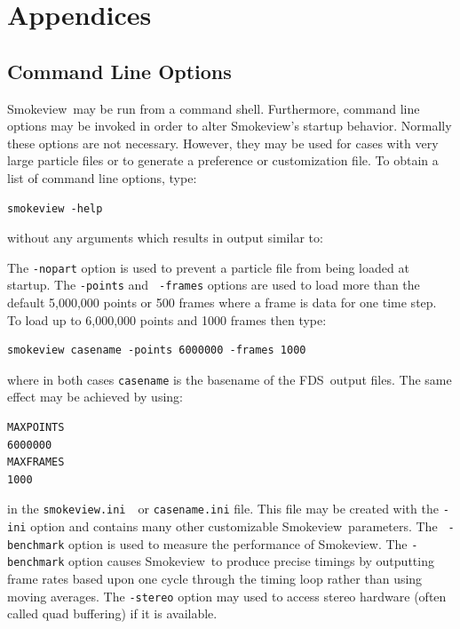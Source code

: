 \documentclass[11pt,twoside]{book}
\newcommand{\svini}{{\tt smokeview.ini}\ }
\newcommand{\fds}{{FDS}}
\newcommand{\Smokeview}{{Smokeview}}
\newcommand{\smokeview}{{Smokeview}}
\begin{document}


\part{Appendices}
\appendix
{}


\chapter{Command Line Options}
\label{sectioncommand} \Smokeview\ may be run from a command
shell.  Furthermore, command line options may be invoked in order
to alter \smokeview's startup behavior. Normally these options are
not necessary.  However, they may be used for cases with very
large particle files or to generate a preference or customization
file. To obtain a list of command line options, type:
\begin{verbatim}
smokeview -help
\end{verbatim}
\noindent without any arguments which results in output similar to:\\

{
\scriptsize

}

\noindent The {\tt -nopart} option is used to prevent a particle
file from being loaded at startup. The {\tt -points} and {\tt
-frames} options are used to load more than the default 5,000,000
points or 500 frames where a frame is data for one time step. To
load up to 6,000,000 points and 1000 frames then type:
\begin{verbatim}
smokeview casename -points 6000000 -frames 1000
\end{verbatim}
\noindent where in both cases {\tt casename} is the basename of
the \fds\ output files. The same effect may be achieved by using:
\begin{verbatim}
MAXPOINTS
6000000
MAXFRAMES
1000
\end{verbatim}
\noindent in the \svini\ or {\tt casename.ini} file.
This file may be created with the {\tt -ini} option and contains
many other customizable \smokeview\ parameters. The {\tt
-benchmark} option is used to measure the performance of
\smokeview. The {\tt -benchmark} option causes \smokeview\ to
produce precise timings by outputting frame rates based upon one
cycle through the timing loop rather than using moving averages.
The {\tt -stereo} option may used to access stereo hardware (often
called quad buffering) if it is available.
\end{document}
